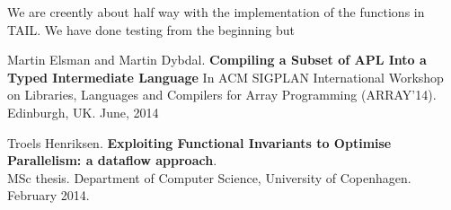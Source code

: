 \documentclass[11pt]{article}
\begin{document}
We are creently about half way with the implementation of the functions in TAIL. We have done testing from the beginning but 


\begin{thebibliography}{widest entry}

   Martin Elsman and Martin Dybdal. \textbf{Compiling a Subset of APL Into a Typed Intermediate Language} In ACM SIGPLAN International Workshop on Libraries, Languages and Compilers for Array Programming (ARRAY’14). Edinburgh, UK. June, 2014

   Troels Henriksen. \textbf{Exploiting Functional Invariants to Optimise Parallelism: a dataflow approach}.\\   MSc thesis. Department of Computer Science, University of Copenhagen. February 2014.
  

\end{thebibliography}
\end{document}
